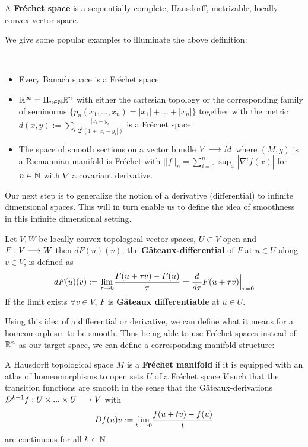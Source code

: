 \begin{definition}
  A \textbf{Fréchet space} is a sequentially complete, Hausdorff, metrizable, locally convex vector space.
\end{definition}

We give some popular examples to illuminate the above definition:

\begin{example}~
\begin{itemize}
  \item Every Banach space is a Fréchet space.
  \item $\mathbb{R}^\infty = \Pi_{n\in \mathbb{N}} \mathbb{R}^n$ with either the cartesian topology or the corresponding family of seminorms $\{p_n(x_1,...,x_n) = |x_1| + ... + |x_n| \}$ together with the metric $d(x,y) := \sum_i \frac{|x_i - y_i|}{2^i (1+|x_i - y_i|)}$ is a Fréchet space.
  \item The space of smooth sections on a vector bundle $V \longrightarrow M$ where $(M,g)$ is a Riemannian manifold is Fréchet with $||f||_n = \sum_{i=0}^n \sup_x |\nabla^i f(x)|$ for $n\in \mathbb{N}$ with $\nabla$ a covariant derivative.
\end{itemize}
\end{example}

Our next step is to generalize the notion of a derivative (differential) to infinite dimensional spaces. This will in turn enable us to define the idea of smoothness in this infinite dimensional setting.

\begin{definition}
  Let $V,W$ be locally convex topological vector spaces, $U\subset V$ open and $F:V \longrightarrow W$ then $dF(u)(v)$, the \textbf{Gâteaux-differential} of $F$ at $u\in U$ along $v\in V$, is defined as
  $$dF(u)(v) := \underset{\tau \rightarrow 0}{\lim} \frac{F(u+\tau v) - F(u)}{\tau} = \frac{d }{d \tau} F(u+\tau v) \Big|_{\tau = 0}$$
  If the limit exists $\forall v \in V$, $F$ is \textbf{Gâteaux differentiable} at $u \in U$.
\end{definition}

Using this idea of a differential or derivative, we can define what it means for a homeomorphism to be smooth. Thus being able to use Fréchet spaces instead of $\mathbb{R}^n$ as our target space, we can define a corresponding manifold structure:

\begin{definition}
\label{def:Frechet_manifolds}
  A Hausdorff topological space $M$ is a \textbf{Fréchet manifold} if it is equipped with an atlas of homeomorphisms to open sets $U$ of a Fréchet space $V$ such that the transition functions are smooth in the sense that the Gâteaux-derivations $D^{k+1}f:U \times ... \times U \longrightarrow V$ with
  $$ Df(u)v := \underset{t \longrightarrow 0}{\lim} \frac{f(u+tv)-f(u)}{t} $$
  are continuous for all $k\in \mathbb{N}$.
\end{definition}

